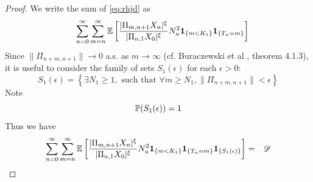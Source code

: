 \begin{proof}
  We write the sum of \eqref{eq:rhjd} as
  \begin{eqnarray*}
    &&
    \sum_{n=0}^\infty \sum_{m=n}^\infty
    \E \left[
      {
        |\Pi_{m, n+1} X_n |^{\xi}
        \over
        |\Pi_{n, 1} X_0 |^{\xi}        
      }
      N_u^2
      \1{m < K_1}
      \1{T_u = m}
    \right]
  \end{eqnarray*}
Since $\| \Pi_{n+m,n+1} \| \to 0$ a.s. as $m \to \infty$
(cf. Buraczewski et al \cite{buraczewski:damek:mikosch:2016},
theorem 4.1.3), it is useful to consider the family of sets
$S_1(\epsilon)$ for each $\epsilon > 0$:
\begin{equation}
  \label{eq:S1}
  S_1(\epsilon) = \left\{
    \exists N_1 \geq 1, \text{ such that } \forall m \geq N_1,
    \| \Pi_{n+m,n+1} \| < \epsilon
  \right\}
\end{equation}
Note
\[
\P(S_1(\epsilon)) = 1
\]
Thus we have  
  \begin{eqnarray}
    \sum_{n=0}^\infty \sum_{m=n}^\infty
    \E \left[
      {
        |\Pi_{m, n+1} X_n |^{\xi}
        \over
        |\Pi_{n, 1} X_0 |^{\xi}        
      }
      N_u^2
      \1{m < K_1} \1{T_u = m} \1{S_1(\epsilon)}
      \right]
    &=& \mathscr D \label{eq:pkce}
  \end{eqnarray}
  

\end{proof}
